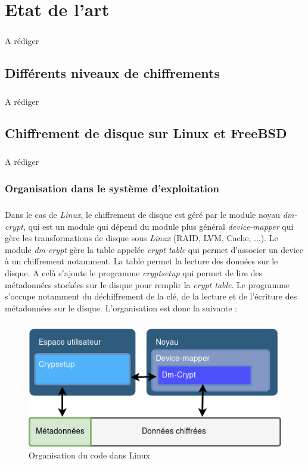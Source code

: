 \chapter{Etat de l'art}
\paragraph*{} A rédiger
\section{Différents niveaux de chiffrements}
\paragraph*{} A rédiger
\section{Chiffrement de disque sur Linux et FreeBSD}
\paragraph*{} A rédiger
\subsection{Organisation dans le système d'exploitation}
\paragraph{}
Dans le cas de {\em Linux}, le chiffrement de disque est géré par le module 
noyau {\em dm-crypt}, qui est un module qui dépend du module plus général
{\em device-mapper} qui gère les transformations de disque sous {\em Linux} 
(RAID, LVM, Cache, ...).
Le module {\em dm-crypt} gère la table appelée {\em crypt table}
qui permet d'associer un device à un chiffrement notamment. La table permet
la lecture des données sur le disque. A celà s'ajoute le programme 
{\em cryptsetup} qui permet de lire des métadonnées stockées sur le disque 
pour remplir la {\em crypt table}.
Le programme s'occupe notamment du déchiffrement de la clé, de 
la lecture et de l'écriture des métadonnées sur le disque. L'organisation est 
donc la suivante :

\paragraph{}
\begin{figure}[h]
\centering
\includegraphics[width=.8\linewidth]{etat_art/organisation_linux.png}
\caption{\label{fig:OrgLinux}Organisation du code dans Linux}
\end{figure}

